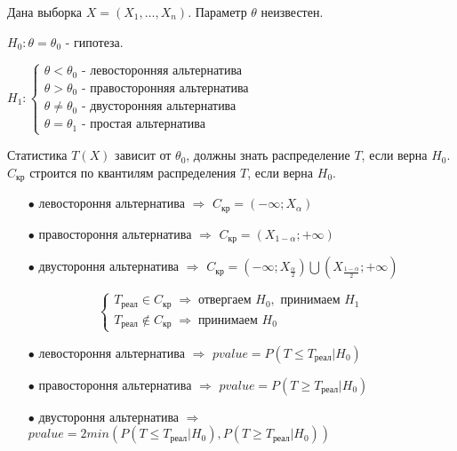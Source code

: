 Дана выборка $X = (X_1, \dots, X_n)$. Параметр $\theta$ неизвестен.

$H_0: \theta = \theta_0$ - гипотеза.

$H_1: \begin{cases}
	\theta < \theta_0 \text{ - левосторонняя альтернатива} \\
	\theta > \theta_0 \text{ - правосторонняя альтернатива} \\
	\theta \not = \theta_0 \text{ - двусторонняя альтернатива} \\
	\theta = \theta_1 \text{ - простая альтернатива} 
\end{cases}$

Статистика $T(X)$ зависит от $\theta_0$, должны знать распределение $T$, если верна $H_0$. $C_{\text{кр}}$ строится по квантилям распределения $T$, если верна $H_0$.

\begin{itemize}
	\item[$\bullet$] левостороння альтернатива $\Rightarrow$ $C_{\text{кр}} = (-\infty; X_{\alpha})$
	\item[$\bullet$] правостороння альтернатива $\Rightarrow$ $C_{\text{кр}} = (X_{1-\alpha}; +\infty)$
	\item[$\bullet$] двустороння альтернатива $\Rightarrow$ $C_{\text{кр}} = (-\infty; X_{\frac{\alpha}{2}})\bigcup (X_{\frac{1-\alpha}{2}}; +\infty)$
\end{itemize}

\begin{rulee}\label{cha:basic/section:stat/subsection:hyp/rule:1}
	$$\begin{cases}
		T_{\text{реал}} \in C_{\text{кр}} \; \Rightarrow \; \text{отвергаем } H_0, \text{ принимаем } H_1 \\
		T_{\text{реал}} \not \in C_{\text{кр}} \; \Rightarrow \; \text{принимаем } H_0
	\end{cases}$$
\end{rulee}

\begin{itemize}
	\item[$\bullet$] левостороння альтернатива $\Rightarrow$ $pvalue = P(T \le T_{\text{реал}} | H_0)$
	\item[$\bullet$] правостороння альтернатива $\Rightarrow$ $pvalue = P(T \ge T_{\text{реал}} | H_0)$
	\item[$\bullet$] двустороння альтернатива $\Rightarrow$ $pvalue = 2 min\left( P(T \le T_{\text{реал}} | H_0), P(T \ge T_{\text{реал}} | H_0) \right)$
\end{itemize}

